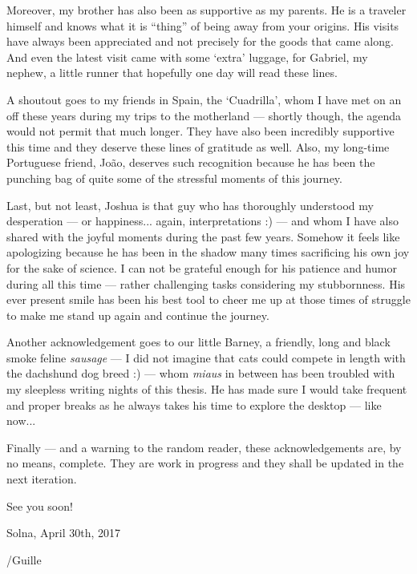 Moreover, my brother has also been as supportive as my parents. He is a traveler 
himself and knows what it is ``thing'' of being away from your origins. His visits 
have always been appreciated and not precisely for the goods that came along. And 
even the latest visit came with some `extra' luggage, for Gabriel, my nephew, a 
little runner that hopefully one day will read these lines.

A shoutout goes to my friends in Spain, the `Cuadrilla', whom I have met on an off 
these years during my trips to the motherland --- shortly though, the agenda would 
not permit that much longer. They have also been incredibly supportive this time 
and they deserve these lines of gratitude as well. Also, my long-time Portuguese 
friend, Jo\~{a}o, deserves such recognition because he has been the punching bag 
of quite some of the stressful moments of this journey.

Last, but not least, Joshua is that guy who has thoroughly understood my desperation --- or happiness... 
again, interpretations :) --- and whom I have also shared with the joyful moments 
during the past few years. Somehow it feels like apologizing because he has been 
in the shadow many times sacrificing his own joy for the sake of science. I can 
not be grateful enough for his patience and humor during all this time --- rather 
challenging tasks considering my stubbornness. His ever present smile has been his 
best tool to cheer me up at those times of struggle to make me stand up again and 
continue the journey.

Another acknowledgement goes to our little Barney, a friendly, long and black 
smoke feline \emph{sausage} --- I did not imagine that cats could compete in length 
with the dachshund dog breed :) --- whom \emph{miaus} in between has been troubled 
with my sleepless writing nights of this thesis. He has made sure I would take frequent 
and proper breaks as he always takes his time to explore the desktop --- like now...

Finally --- and a warning to the random reader, these acknowledgements are, by no 
means, complete. They are work in progress and they shall be updated in the next 
iteration.

See you soon!

\vspace{1.5em}

\hfill\begin{minipage}[t]{0.33\textwidth}
        \begin{center}
            Solna, April 30th, 2017
            
            \vspace{0.75em}
            
            /Guille
        \end{center}
\end{minipage}

